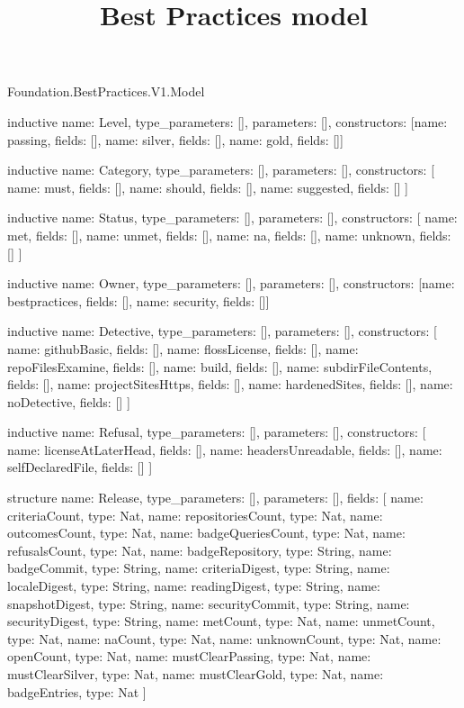 \begin{lexlean}{Foundation.BestPractices.V1.Model}
\title{Best Practices model}
\begin{semanticmodule}
inductive{
  name: Level,
  type_parameters: [],
  parameters: [],
  constructors: [{name: passing, fields: []}, {name: silver, fields: []}, {name: gold, fields: []}]
}

inductive{
  name: Category,
  type_parameters: [],
  parameters: [],
  constructors: [
    {name: must, fields: []},
    {name: should, fields: []},
    {name: suggested, fields: []}
  ]
}

inductive{
  name: Status,
  type_parameters: [],
  parameters: [],
  constructors: [
    {name: met, fields: []},
    {name: unmet, fields: []},
    {name: na, fields: []},
    {name: unknown, fields: []}
  ]
}

inductive{
  name: Owner,
  type_parameters: [],
  parameters: [],
  constructors: [{name: bestpractices, fields: []}, {name: security, fields: []}]
}

inductive{
  name: Detective,
  type_parameters: [],
  parameters: [],
  constructors: [
    {name: githubBasic, fields: []},
    {name: flossLicense, fields: []},
    {name: repoFilesExamine, fields: []},
    {name: build, fields: []},
    {name: subdirFileContents, fields: []},
    {name: projectSitesHttps, fields: []},
    {name: hardenedSites, fields: []},
    {name: noDetective, fields: []}
  ]
}

inductive{
  name: Refusal,
  type_parameters: [],
  parameters: [],
  constructors: [
    {name: licenseAtLaterHead, fields: []},
    {name: headersUnreadable, fields: []},
    {name: selfDeclaredFile, fields: []}
  ]
}

structure{
  name: Release,
  type_parameters: [],
  parameters: [],
  fields: [
    {name: criteriaCount, type: Nat},
    {name: repositoriesCount, type: Nat},
    {name: outcomesCount, type: Nat},
    {name: badgeQueriesCount, type: Nat},
    {name: refusalsCount, type: Nat},
    {name: badgeRepository, type: String},
    {name: badgeCommit, type: String},
    {name: criteriaDigest, type: String},
    {name: localeDigest, type: String},
    {name: readingDigest, type: String},
    {name: snapshotDigest, type: String},
    {name: securityCommit, type: String},
    {name: securityDigest, type: String},
    {name: metCount, type: Nat},
    {name: unmetCount, type: Nat},
    {name: naCount, type: Nat},
    {name: unknownCount, type: Nat},
    {name: openCount, type: Nat},
    {name: mustClearPassing, type: Nat},
    {name: mustClearSilver, type: Nat},
    {name: mustClearGold, type: Nat},
    {name: badgeEntries, type: Nat}
  ]
}


\end{semanticmodule}
\end{lexlean}

